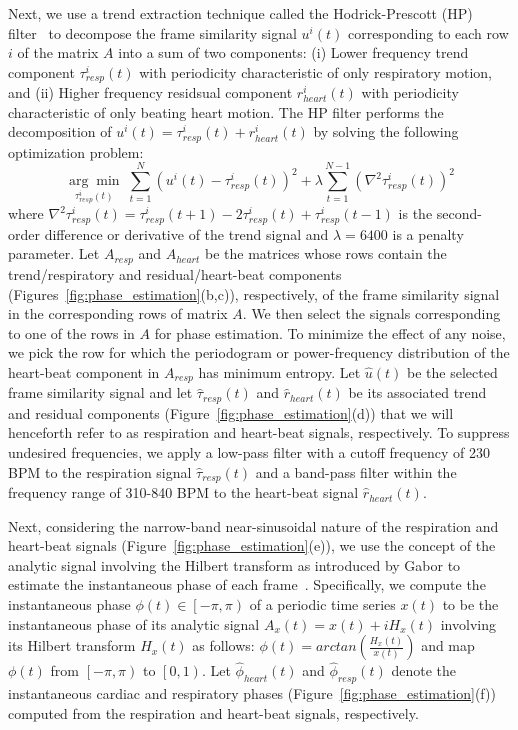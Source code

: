 \documentclass[journal]{IEEEtran}
\newcommand{\argmin}[1]{\underset{#1}{\operatorname{arg}\operatorname{min}}\;}
\begin{document}
	Next, we use a trend extraction technique called the Hodrick-Prescott (HP) filter~\cite{Alexandrov2012} to decompose the frame similarity signal $u^i(t)$ corresponding to each row $i$ of the matrix $A$ into a sum of two components: (i) Lower frequency trend component $\tau^i_{resp}(t)$ with periodicity characteristic of only respiratory motion, and (ii) Higher frequency residsual component $r^i_{heart}(t)$ with periodicity characteristic of only beating heart motion. The HP filter performs the decomposition of $u^i(t) = \tau^i_{resp}(t) + r^i_{heart}(t)$ by solving the following optimization problem:
\begin{equation}	
\argmin{\tau^i_{resp}(t)} \sum_{t=1}^{N}  \left(u^i(t) - \tau^i_{resp}(t) \right)^2  + \lambda \sum_{t=1}^{N-1} \left( \nabla^2 \tau^i_{resp}(t) \right)^2
\end{equation}
where $\nabla^2\tau^i_{resp}(t) = \tau^i_{resp}(t+1) - 2 \tau^i_{resp}(t) + \tau^i_{resp}(t-1)$ is the second-order difference or derivative of the trend signal and $\lambda=6400$ is a penalty parameter. Let $A_{resp}$ and $A_{heart}$ be the matrices whose rows contain the trend/respiratory and residual/heart-beat components (Figures~\ref{fig:phase_estimation}(b,c)), respectively, of the frame similarity signal in the corresponding rows of matrix $A$. We then select the signals corresponding to one of the rows in $A$ for phase estimation. To minimize the effect of any noise, we pick the row for which the periodogram or power-frequency distribution of the heart-beat component in $A_{resp}$ has minimum entropy. Let $\hat{u}(t)$ be the selected frame similarity signal and let $\hat{\tau}_{resp}(t)$ and $\hat{r}_{heart}(t)$  be its associated trend and residual components  (Figure~\ref{fig:phase_estimation}(d)) that we will henceforth refer to as respiration and heart-beat signals, respectively. To suppress undesired frequencies, we apply a low-pass filter with a cutoff frequency of 230 BPM to the respiration signal $\hat{\tau}_{resp}(t)$ and a band-pass filter within the frequency range of 310-840 BPM to the heart-beat signal $\hat{r}_{heart}(t)$.

	Next, considering the narrow-band near-sinusoidal nature of the respiration and heart-beat signals (Figure~\ref{fig:phase_estimation}(e)), we use the concept of the analytic signal involving the Hilbert transform as introduced by Gabor to estimate the instantaneous phase of each frame~\cite{Gabor1946,Bracewell1986,Rosenblum2001,Freund2003,Kuklik2015}. Specifically, we compute the instantaneous phase $\phi(t) \in \left [  -\pi, \pi\right )$ of a periodic time series $x(t)$ to be the instantaneous phase of its analytic signal $A_x(t) = x(t) + i H_x(t)$ involving its Hilbert transform $H_x(t)$ as follows: $\phi(t) = arctan \left( \frac{H_x(t)}{x(t)}\right)$ and map $\phi(t)$ from $\left [  -\pi, \pi\right )$ to $\left [  0, 1\right )$. Let $\hat{\phi}_{heart}(t)$ and $\hat{\phi}_{resp}(t)$ denote the instantaneous cardiac and respiratory phases (Figure~\ref{fig:phase_estimation}(f)) computed from the respiration and heart-beat signals, respectively.
%
\end{document}
